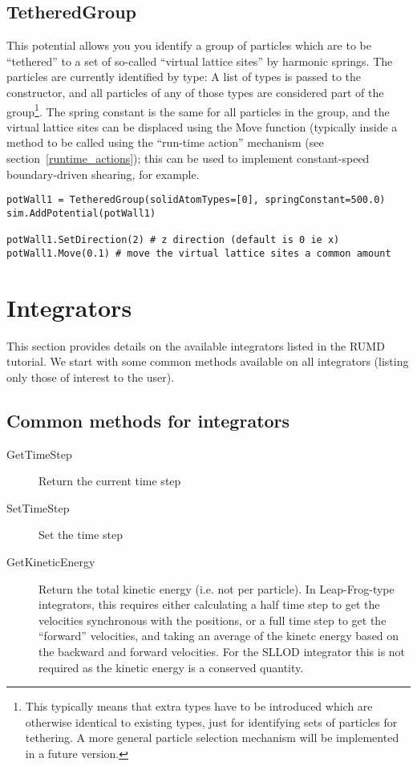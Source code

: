 \documentclass[a4paper]{article}
\begin{document}
\subsection{TetheredGroup}

This potential allows you you identify a group of particles which are to be
``tethered'' to a set of so-called ``virtual lattice sites'' by harmonic 
springs. The particles are currently identified by type: A list of types is 
passed to the constructor, and all particles of any of those types are considered 
part of the group\footnote{This typically means that extra types have to be 
introduced which are otherwise identical to existing types, just for identifying sets of
particles for tethering. A more general particle selection mechanism will be 
implemented in a future version.}. The spring constant is the same for all 
particles in the group, and the virtual lattice sites can be displaced using
the Move function (typically inside a method to be called using the 
``run-time action'' mechanism (see section~\ref{runtime_actions}); this can be
used to implement constant-speed boundary-driven shearing, for example.

\begin{verbatim}
potWall1 = TetheredGroup(solidAtomTypes=[0], springConstant=500.0)
sim.AddPotential(potWall1)

potWall1.SetDirection(2) # z direction (default is 0 ie x)
potWall1.Move(0.1) # move the virtual lattice sites a common amount
\end{verbatim}

\section{Integrators}

This section provides details on the available integrators listed in the RUMD tutorial. We start with some common methods available on all integrators (listing only those of interest to the user).

\subsection{Common methods for integrators}

\begin{description}
\item [GetTimeStep] Return the current time step
\item [SetTimeStep] Set the time step
\item [GetKineticEnergy] Return the total kinetic energy (i.e. not per particle). In Leap-Frog-type integrators, this requires either calculating a half time step to get the velocities synchronous with the positions, or a full time step to get the ``forward'' velocities, and taking an average of the kinetc energy based on the backward and forward velocities. For the SLLOD integrator this is not required as the kinetic energy is a conserved quantity.
\end{description}
\end{document}
